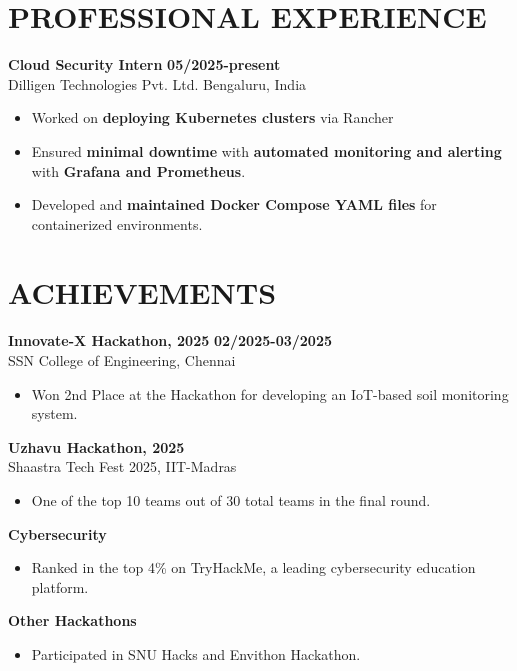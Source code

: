 \documentclass[10pt, letterpaper]{article} %
\begin{document}
\vspace{0.75em} %
\section*{PROFESSIONAL EXPERIENCE}
\textbf{Cloud Security Intern} \hfill \textbf{05/2025-present} \\
Dilligen Technologies Pvt. Ltd. \hfill Bengaluru, India
\begin{itemize}
    \item Worked on \textbf{deploying Kubernetes clusters} via Rancher
    \item Ensured \textbf{minimal downtime} with \textbf{automated monitoring and alerting} with \textbf{Grafana and Prometheus}.
    \item Developed and \textbf{maintained Docker Compose YAML files} for containerized environments.
\end{itemize}

\vspace{0.75em} %
\section*{ACHIEVEMENTS}
\textbf{Innovate-X Hackathon, 2025} \hfill \textbf{02/2025-03/2025} \\
SSN College of Engineering, Chennai
\begin{itemize}
    \item Won 2nd Place at the Hackathon for developing an IoT-based soil monitoring system.
\end{itemize}

\vspace{0.85em} %
\textbf{Uzhavu Hackathon, 2025} \\
Shaastra Tech Fest 2025, IIT-Madras
\begin{itemize}
    \item One of the top 10 teams out of 30 total teams in the final round.
\end{itemize}

\vspace{0.85em} %
\textbf{Cybersecurity}
\begin{itemize}
    \item Ranked in the top 4\% on TryHackMe, a leading cybersecurity education platform.
\end{itemize}

\vspace{0.85em} %
\textbf{Other Hackathons}
\begin{itemize}
    \item Participated in SNU Hacks and Envithon Hackathon.
\end{itemize}
\end{document}
